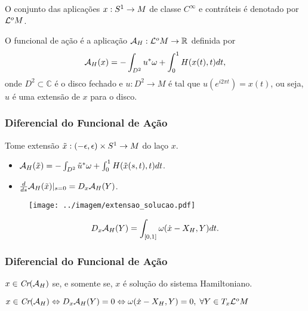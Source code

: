 \documentclass{beamer}
\begin{document}
\begin{footnotesize}
\begin{frame}
		O conjunto das aplicações $x:S^{1} \to M$ de classe $C^{\infty}$ e contráteis é denotado por $\mathcal{L}^{o}M$.
		
		\begin{definicao}
			O funcional de ação é a aplicação $\mathcal{A}_{H}: \mathcal{L}^{o}M\to \mathbb{R}^{}$ definida por
			$$
			\mathcal{A}_{H}(x) = -\int_{D^{2}}u^{*}\omega + \int_{0}^{1}H(x(t), t)dt,
			$$
			onde $D^{2} \subset \mathbb{C}$ é o disco fechado e $u:D^{2}\to M$ é tal que $u(e^{i2\pi t})=x(t)$, ou seja, $u$ é uma extensão de $x$ para o disco.
			
		\end{definicao}
	\end{frame}
	
	\begin{frame}
		\frametitle{Diferencial do Funcional de Ação}
		\begin{minipage}[t]{0.55\linewidth}
			Tome extensão 
			$
			\tilde{x}:(-\epsilon, \epsilon)\times S^{1} \to M
			$ do laço $x$.
			\begin{itemize}
				\item $
				\mathcal{A}_{H}(\tilde{x}) = -\int_{D^{2}}\tilde{u}^{*}\omega + \int_{0}^{1}H(\tilde{x}(s,t),t)dt
				$.
				
				\item  $\frac{d }{d s}\mathcal{A}_{H}(\tilde{x})|_{s=0} = D_{x}\mathcal{A}_{H}(Y) $.
				
			\end{itemize}
			
		\end{minipage}
		\hfill
		\begin{minipage}[t]{0.4\linewidth}
			\begin{figure}[!h]
				\centering
				\texttt{[image: ../imagem/extensao\_solucao.pdf]}
				
			\end{figure}
		\end{minipage}
			
				
		\begin{proposicao}
			$$
		D_{x}\mathcal{A}_{H}(Y) = \int_{[0,1]} \omega(\dot{x} - X_{H}, Y)dt.
		$$
		\end{proposicao}
		
	\end{frame}
	
	\begin{frame}
				\frametitle{Diferencial do Funcional de Ação}
		\begin{proposicao}
			$x \in \textit{Cr}(\mathcal{A}_{H})$ se, e somente se, $x$ é solução do sistema Hamiltoniano.
		\end{proposicao}
		\begin{prova}
			$x \in \textit{Cr}(\mathcal{A}_{H}) \Leftrightarrow
			D_{x}\mathcal{A}_{H}(Y) = 0 \Leftrightarrow \omega(\dot{x} - X_{H}, Y)=0,\; \forall Y \in T_{x}\mathcal{L}^{o}M
			$
			

\end{prova}
\end{frame}
\end{footnotesize}
\end{document}
